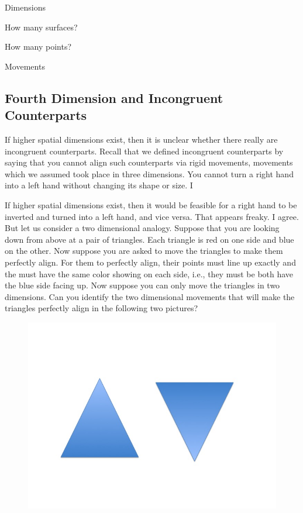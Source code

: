 \documentclass[oneside]{article}
\begin{document}
Dimensions

How many surfaces? 

How many points? 


Movements


\subsection*{Fourth Dimension and Incongruent Counterparts}

If higher spatial dimensions exist, then it is unclear whether there really are incongruent counterparts. Recall that we defined incongruent counterparts by saying that you cannot align such counterparts via rigid movements, movements which we assumed took place in three dimensions. You cannot turn a right hand into a left hand without changing its shape or size. I

If higher spatial dimensions exist, then it would be feasible for a right hand to be inverted and turned into a left hand, and vice versa. That appears freaky. I agree. But let us consider a two dimensional analogy. Suppose that you are looking down from above at a pair of triangles. Each triangle is red on one side and blue on the other. Now suppose you are asked to move the triangles to make them perfectly align. For them to perfectly align, their points must line up exactly and the must have the same color showing on each side, i.e., they must be both have the blue side facing up. Now suppose you can only move the triangles in two dimensions. Can you identify the two dimensional movements that will make the triangles perfectly align in the following two pictures? 


\begin{figure}[h]
  \includegraphics[width=\linewidth]{2d.jpg}
\end{figure}
\end{document}
